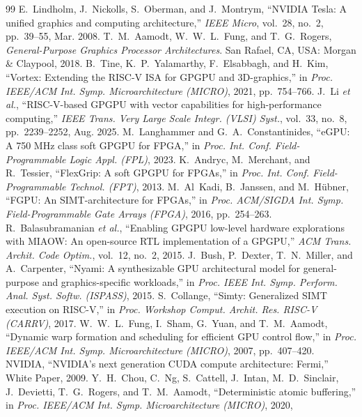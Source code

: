 \documentclass[journal]{IEEEtran}
\begin{document}
\begin{thebibliography}{99}
 E.~Lindholm, J.~Nickolls, S.~Oberman, and J.~Montrym,
``NVIDIA Tesla: A unified graphics and computing architecture,''
\emph{IEEE Micro}, vol.~28, no.~2, pp.~39--55, Mar. 2008.
 T.~M.~Aamodt, W.~W.~L.~Fung, and T.~G.~Rogers,
\emph{General-Purpose Graphics Processor Architectures}. San Rafael, CA, USA:
Morgan \& Claypool, 2018.
 B.~Tine, K.~P.~Yalamarthy, F.~Elsabbagh, and H.~Kim,
``Vortex: Extending the RISC-V ISA for GPGPU and 3D-graphics,'' in
\emph{Proc. IEEE/ACM Int. Symp. Microarchitecture (MICRO)}, 2021, pp.~754--766.
 J.~Li \emph{et al.}, ``RISC-V-based GPGPU with vector
capabilities for high-performance computing,'' \emph{IEEE Trans. Very Large Scale
Integr. (VLSI) Syst.}, vol.~33, no.~8, pp.~2239--2252, Aug. 2025.
 M.~Langhammer and G.~A.~Constantinides, ``eGPU: A 750 MHz class
soft GPGPU for FPGA,'' in \emph{Proc. Int. Conf. Field-Programmable Logic Appl.
(FPL)}, 2023.
 K.~Andryc, M.~Merchant, and R.~Tessier, ``FlexGrip: A soft
GPGPU for FPGAs,'' in \emph{Proc. Int. Conf. Field-Programmable Technol. (FPT)},
2013.
 M.~Al~Kadi, B.~Janssen, and M.~H\"ubner, ``FGPU: An
SIMT-architecture for FPGAs,'' in \emph{Proc. ACM/SIGDA Int. Symp.
Field-Programmable Gate Arrays (FPGA)}, 2016, pp.~254--263.
 R.~Balasubramanian \emph{et al.}, ``Enabling GPGPU low-level
hardware explorations with MIAOW: An open-source RTL implementation of a GPGPU,''
\emph{ACM Trans. Archit. Code Optim.}, vol.~12, no.~2, 2015.
 J.~Bush, P.~Dexter, T.~N.~Miller, and A.~Carpenter, ``Nyami: A
synthesizable GPU architectural model for general-purpose and graphics-specific
workloads,'' in \emph{Proc. IEEE Int. Symp. Perform. Anal. Syst. Softw.
(ISPASS)}, 2015.
 S.~Collange, ``Simty: Generalized SIMT execution on RISC-V,'' in
\emph{Proc. Workshop Comput. Archit. Res. RISC-V (CARRV)}, 2017.
 W.~W.~L.~Fung, I.~Sham, G.~Yuan, and T.~M.~Aamodt, ``Dynamic warp
formation and scheduling for efficient GPU control flow,'' in \emph{Proc. IEEE/ACM
Int. Symp. Microarchitecture (MICRO)}, 2007, pp.~407--420.
 NVIDIA, ``NVIDIA's next generation CUDA compute architecture:
Fermi,'' White Paper, 2009.
 Y.~H.~Chou, C.~Ng, S.~Cattell, J.~Intan, M.~D.~Sinclair,
J.~Devietti, T.~G.~Rogers, and T.~M.~Aamodt, ``Deterministic atomic buffering,''
in \emph{Proc. IEEE/ACM Int. Symp. Microarchitecture (MICRO)}, 2020,

\end{thebibliography}
\end{document}
